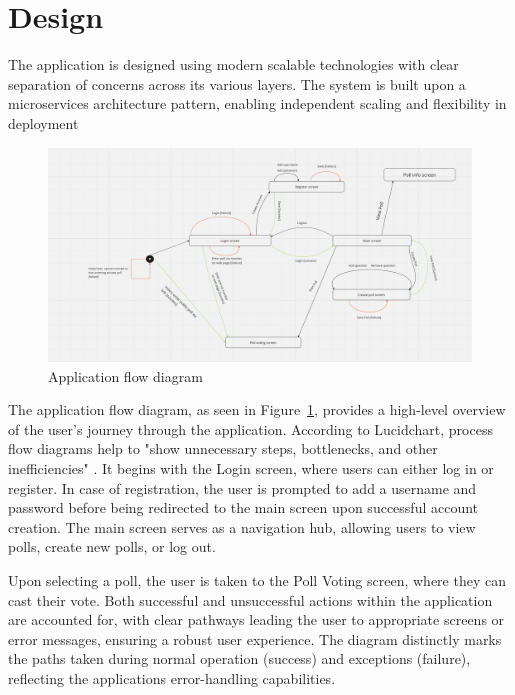 \section{Design}
\label{sec:design}

The application is designed using modern scalable technologies with clear separation of concerns across its various layers. 
The system is built upon a microservices architecture pattern, enabling independent scaling and flexibility in deployment


\begin{figure}[!htbp]
\centering
\includegraphics[width=\linewidth]{figs/ApplicationFlowDiagram.png}
\caption{Application flow diagram}
\label{fig:appflow}
\end{figure}

The application flow diagram, as seen in Figure~\ref{fig:appflow}, provides a high-level overview of the user's journey through the application. According to Lucidchart, process flow diagrams help to "show unnecessary steps, bottlenecks, and other inefficiencies" \cite{lucidchart2023}. It begins with the Login screen, where users can either log in or register. In case of registration, the user is prompted to add a username and password before being redirected to the main screen upon successful account creation. The main screen serves as a navigation hub, allowing users to view polls, create new polls, or log out.

Upon selecting a poll, the user is taken to the Poll Voting screen, where they can cast their vote. Both successful and unsuccessful actions within the application are accounted for, with clear pathways leading the user to appropriate screens or error messages, ensuring a robust user experience. The diagram distinctly marks the paths taken during normal operation (success) and exceptions (failure), reflecting the applications error-handling capabilities.

